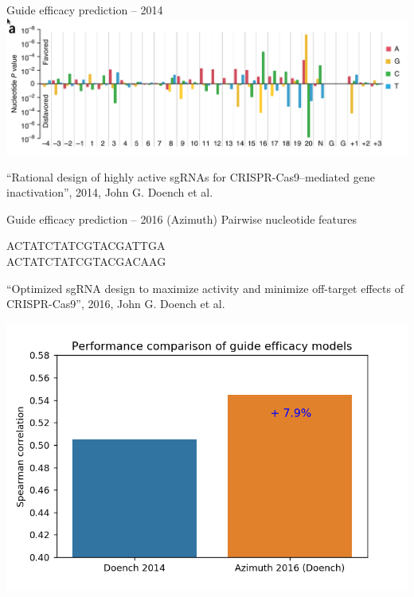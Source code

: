 \documentclass[Nike]{tuberlinbeamer}
\begin{document}
\begin{frame}{Guide efficacy prediction -- 2014}
  \includegraphics[width=\linewidth]{./nucleotide_table.png}
  \begin{flushright}
    \tiny
    ``Rational design of highly active sgRNAs for CRISPR-Cas9–mediated gene inactivation'', 2014, John G. Doench et al.\
  \end{flushright}
\end{frame}

\begin{frame}{Guide efficacy prediction -- 2016 (Azimuth)}
  Pairwise nucleotide features

  \pause
  \huge ACTATCTATCGTACGA{\color{red}TT}GA \\
    \pause
  ACTATCTATCGTACGAC{\color{red}AA}G
    \begin{flushright}
      \tiny
      ``Optimized sgRNA design to maximize activity and minimize off-target effects of CRISPR-Cas9'', 2016, John G. Doench et al.\
    \end{flushright}
    \pause
  \center
  \includegraphics[width=0.5\linewidth]{./model_comparison1.png}
\end{frame}
\end{document}
